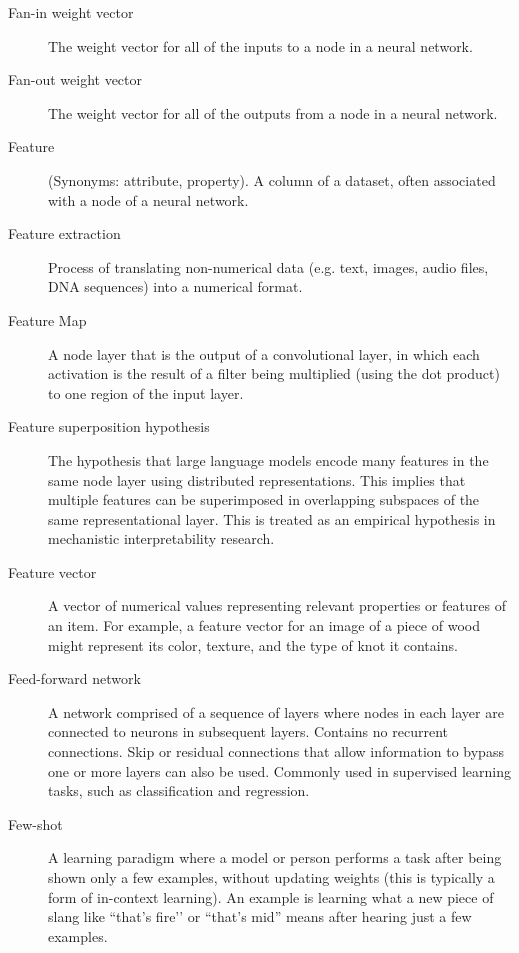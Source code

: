 \begin{description}
\item[Fan-in weight vector] The weight vector for all of the inputs to a node in a neural network.

\item[Fan-out weight vector] The weight vector for all of the outputs from a node in a neural network.

\item[Feature] (Synonyms: attribute, property). A column of a dataset, often associated with a node of a neural network.

\item[Feature extraction]  Process of translating non-numerical data (e.g. text, images, audio files, DNA sequences) into a numerical format. %

\item[Feature Map] A node layer that is the output of a convolutional layer, in which each activation is the result of a filter being multiplied (using the dot product) to one region of the input layer.

\item[Feature superposition hypothesis] The hypothesis that large language models encode many features in the same node layer using distributed representations. This implies that multiple features can be superimposed in overlapping subspaces of the same representational layer. This is treated as an empirical hypothesis in mechanistic interpretability research.

\item[Feature vector] A vector of numerical values representing relevant properties or features of an item. For example, a feature vector for an image of a piece of wood might represent its color, texture, and the type of knot it contains.

\item[Feed-forward network] A network comprised of a sequence of layers where nodes in each layer are connected to neurons in subsequent layers. Contains no recurrent connections. Skip or residual connections that allow information to bypass one or more layers can also be used. Commonly used in supervised learning tasks, such as classification and regression.

\item[Few-shot] A learning paradigm where a model or person performs a task after being shown only a few examples, without updating weights (this is typically a form of in-context learning). An example is learning what a new piece of slang like ``that’s fire’’ or ``that’s mid'' means after hearing just a few examples.


\end{description}
